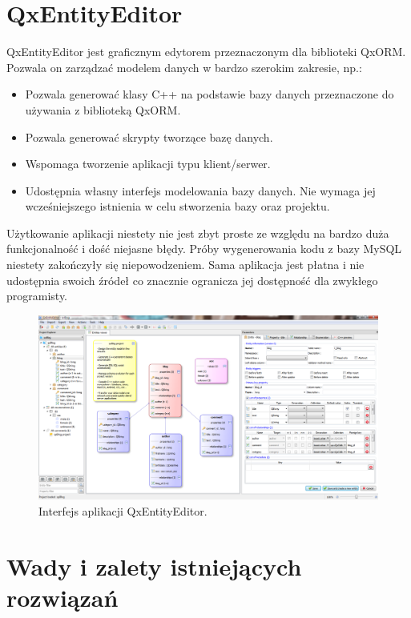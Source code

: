 \documentclass[12pt]{report}
\begin{document}
\section{QxEntityEditor}

QxEntityEditor jest graficznym edytorem przeznaczonym dla biblioteki QxORM. Pozwala on zarządzać modelem danych w bardzo szerokim zakresie, np.:

\begin{itemize}
\item{Pozwala generować klasy C++ na podstawie bazy danych przeznaczone do używania z biblioteką QxORM.}
\item{Pozwala generować skrypty tworzące bazę danych.}
\item{Wspomaga tworzenie aplikacji typu klient/serwer.}
\item{Udostępnia własny interfejs modelowania bazy danych. Nie wymaga jej wcześniejszego istnienia w celu stworzenia bazy oraz projektu.}
\end{itemize}

Użytkowanie aplikacji niestety nie jest zbyt proste ze względu na bardzo duża funkcjonalność i dość niejasne błędy. Próby wygenerowania kodu z bazy MySQL niestety zakończyły się niepowodzeniem. Sama aplikacja jest płatna i nie udostępnia swoich źródeł co znacznie ogranicza jej dostępność dla zwykłego programisty.

\begin{figure}[h]
	\centering
	\includegraphics[width=1\textwidth]{images/qxentity.png}
	\caption{Interfejs aplikacji QxEntityEditor.}
\end{figure}

\FloatBarrier

\section{Wady i zalety istniejących rozwiązań}
\end{document}
